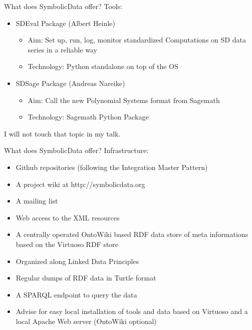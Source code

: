 \documentclass{beamer}
\begin{document}
\begin{frame}{What does SymbolicData offer?}{}
{Tools:}
\begin{itemize}
\item SDEval Package (Albert Heinle)
\begin{itemize}
\item Aim: Set up, run, log, monitor standardized Computations on SD data
  series in a reliable way 
\item Technology: Python standalone on top of the OS
\end{itemize}
\item SDSage Package (Andreas Nareike)
\begin{itemize}
\item Aim: Call the new Polynomial Systems format from Sagemath 
\item Technology: Sagemath Python Package
\end{itemize}
\end{itemize}
I will not touch that topic in my talk.
\end{frame}

\begin{frame}{What does SymbolicData offer?}{}
{Infrastructure:}
\begin{itemize}
\item Github repositories (following the Integration Master Pattern)
\item A project wiki at http://symbolicdata.org
\item A mailing list
\item Web access to the XML resources
\item A centrally operated OntoWiki based RDF data store of meta informations
  based on the Virtuoso RDF store
\item Organized along Linked Data Principles
\item Regular dumps of RDF data in Turtle format
\item A SPARQL endpoint to query the data
\item Advise for easy local installation of tools and data based on Virtuoso
  and a local Apache Web server (OntoWiki optional)
\end{itemize}
\end{frame}
\end{document}
